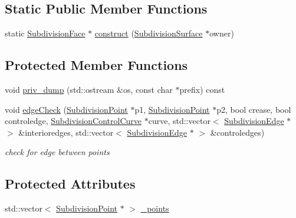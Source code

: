 \subsection*{Static Public Member Functions}
\begin{DoxyCompactItemize}
\item 
static \hyperlink{classShipCAD_1_1SubdivisionFace}{Subdivision\+Face} $\ast$ \hyperlink{classShipCAD_1_1SubdivisionFace_a4a6f182fa7e5cf63fc95c7614805f136}{construct} (\hyperlink{classShipCAD_1_1SubdivisionSurface}{Subdivision\+Surface} $\ast$owner)
\end{DoxyCompactItemize}
\subsection*{Protected Member Functions}
\begin{DoxyCompactItemize}
\item 
void \hyperlink{classShipCAD_1_1SubdivisionFace_ab2f647963b552728f40d8c329318676e}{priv\+\_\+dump} (std\+::ostream \&os, const char $\ast$prefix) const 
\item 
void \hyperlink{classShipCAD_1_1SubdivisionFace_a5399f7ec8ed458f6dbc733688c006cf8}{edge\+Check} (\hyperlink{classShipCAD_1_1SubdivisionPoint}{Subdivision\+Point} $\ast$p1, \hyperlink{classShipCAD_1_1SubdivisionPoint}{Subdivision\+Point} $\ast$p2, bool crease, bool controledge, \hyperlink{classShipCAD_1_1SubdivisionControlCurve}{Subdivision\+Control\+Curve} $\ast$curve, std\+::vector$<$ \hyperlink{classShipCAD_1_1SubdivisionEdge}{Subdivision\+Edge} $\ast$ $>$ \&interioredges, std\+::vector$<$ \hyperlink{classShipCAD_1_1SubdivisionEdge}{Subdivision\+Edge} $\ast$ $>$ \&controledges)
\begin{DoxyCompactList}\small\item\em check for edge between points \end{DoxyCompactList}\end{DoxyCompactItemize}
\subsection*{Protected Attributes}
\begin{DoxyCompactItemize}
\item 
std\+::vector$<$ \hyperlink{classShipCAD_1_1SubdivisionPoint}{Subdivision\+Point} $\ast$ $>$ \hyperlink{classShipCAD_1_1SubdivisionFace_ae1178fe10860c57e3e54a397b4dc7b4b}{\+\_\+points}
\end{DoxyCompactItemize}


